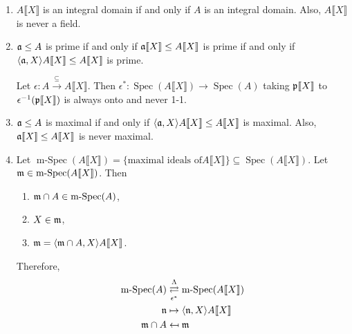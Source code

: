 \begin{proposition}
\begin{enumerate}
        \item $A\llbracket X \rrbracket$ is an integral domain if and only if $A$ is an integral domain. Also, $A\llbracket X \rrbracket$ is never a field.
        \item $\mathfrak{a} \leq A$ is prime if and only if $\mathfrak{a} \llbracket X \rrbracket \leq A\llbracket X \rrbracket$ is prime if and only if $\langle \mathfrak{a},X \rangle A \llbracket X \rrbracket \leq A\llbracket X \rrbracket$ is prime. \par 
            Let $\epsilon: A \xrightarrow {\subseteq} A\llbracket X \rrbracket$. Then $\epsilon^*: \operatorname{Spec}(A\llbracket X \rrbracket) \to \operatorname{Spec}(A)$ taking $\mathfrak{p} \llbracket X \rrbracket$ to $\epsilon^{-1}(\mathfrak{p}\llbracket X \rrbracket)$ is always onto and never 1-1.
        \item $\mathfrak{a} \leq A$ is maximal if and only if $\langle \mathfrak{a},X \rangle A \llbracket X \rrbracket \leq A \llbracket X \rrbracket$ is maximal. Also, $\mathfrak{a} \llbracket X \rrbracket \leq A\llbracket X \rrbracket$ is never maximal.
        \item Let $\operatorname{m-Spec}(A\llbracket X \rrbracket) = \{\text{maximal ideals of}A\llbracket X \rrbracket\} \subseteq \operatorname{Spec}(A\llbracket X \rrbracket)$. Let $\mathfrak{m} \in \operatorname{m-Spec}(A\llbracket X \rrbracket)$. Then 
            \begin{enumerate}
                \item $\mathfrak{m} \cap A \in \operatorname{m-Spec}(A)$,
                \item $X \in \mathfrak{m}$,
                \item $\mathfrak{m} = \langle \mathfrak{m} \cap A,X \rangle A\llbracket X \rrbracket$.
            \end{enumerate}
            \par Therefore,
            \begin{align*}
                \operatorname{m-Spec}(A) &\mathrel{\mathop{\rightleftarrows}^{\mathrm{\Lambda}}_{\mathrm{\epsilon^*}}} \operatorname{m-Spec}(A\llbracket X \rrbracket)  \\
                \mathfrak{n} & \mapsto \langle \mathfrak{n},X \rangle A\llbracket X \rrbracket \\
                \mathfrak{m} \cap A &\mapsfrom \mathfrak{m}
            \end{align*}
    \end{enumerate}
\end{proposition}

